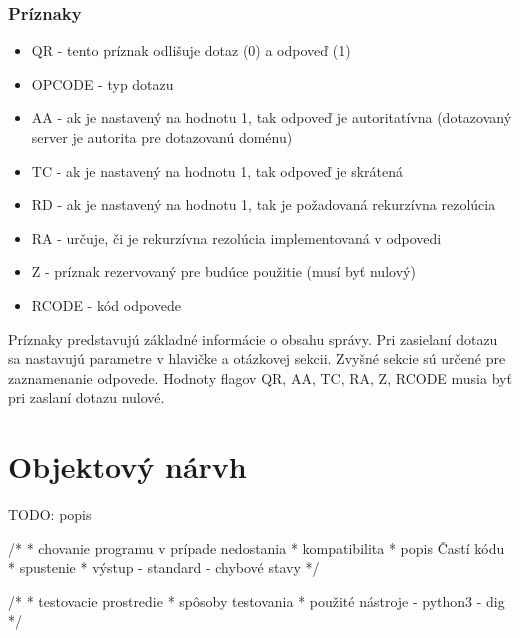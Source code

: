 \subsubsection{Príznaky}
\begin{itemize}
    \item QR - tento príznak odlišuje dotaz (0) a odpoveď (1)
    \item OPCODE - typ dotazu
    \item AA - ak je nastavený na hodnotu 1, tak odpoveď je autoritatívna (dotazovaný server je autorita pre dotazovanú doménu)
    \item TC - ak je nastavený na hodnotu 1, tak odpoveď je skrátená
    \item RD - ak je nastavený na hodnotu 1, tak je požadovaná rekurzívna rezolúcia
    \item RA - určuje, či je rekurzívna rezolúcia implementovaná v odpovedi
    \item Z - príznak rezervovaný pre budúce použitie (musí byť nulový)
    \item RCODE - kód odpovede
\end{itemize}

Príznaky predstavujú základné informácie o obsahu správy.
Pri zasielaní dotazu sa nastavujú parametre v hlavičke a otázkovej sekcii. Zvyšné sekcie sú určené pre zaznamenanie odpovede. Hodnoty flagov
QR, AA, TC, RA, Z, RCODE musia byť pri zaslaní dotazu nulové.

\section{Objektový nárvh}
\label{Objektový návrh}

TODO: popis





/*
 * chovanie programu v prípade nedostania
 * kompatibilita
 * popis Častí kódu 
 * spustenie
 * výstup   - standard
            - chybové stavy
 */



/*
 * testovacie prostredie
 * spôsoby testovania
 * použité nástroje - python3
                    - dig 
 */



